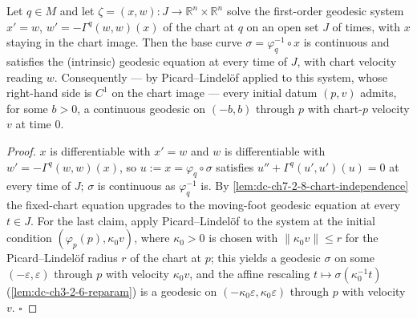\begin{lemma}
  \label{lem:dc-ch7-2-8-flow-geodesic}
  \leanok
  Let $q\in M$ and let $\zeta=(x,w):J\to\mathbb R^n\times\mathbb R^n$ solve the
  first-order geodesic system $x'=w$, $w'=-\Gamma^q(w,w)(x)$ of the chart at $q$
  on an open set $J$ of times, with $x$ staying in the chart image. Then the base
  curve $\sigma=\varphi_q^{-1}\circ x$ is continuous and satisfies the (intrinsic)
  geodesic equation at every time of $J$, with chart velocity reading $w$.
  Consequently — by Picard–Lindelöf applied to this system, whose right-hand side
  is $C^1$ on the chart image — every initial datum $(p,v)$ admits, for some
  $b>0$, a continuous geodesic on $(-b,b)$ through $p$ with chart-$p$ velocity
  $v$ at time $0$.
\end{lemma}
\begin{proof}
  \leanok
  $x$ is differentiable with $x'=w$ and $w$ is differentiable with
  $w'=-\Gamma^q(w,w)(x)$, so $u:=x=\varphi_q\circ\sigma$ satisfies
  $u''+\Gamma^q(u',u')(u)=0$ at every time of $J$; $\sigma$ is continuous as
  $\varphi_q^{-1}$ is. By \cref{lem:dc-ch7-2-8-chart-independence} the fixed-chart
  equation upgrades to the moving-foot geodesic equation at every $t\in J$.
  For the last claim, apply Picard–Lindelöf to the system at the initial condition
  $(\varphi_p(p),\kappa_0v)$, where $\kappa_0>0$ is chosen with
  $\|\kappa_0v\|\le r$ for the Picard–Lindelöf radius $r$ of the chart at $p$;
  this yields a geodesic $\sigma$ on some $(-\varepsilon,\varepsilon)$ through $p$
  with velocity $\kappa_0v$, and the affine rescaling
  $t\mapsto\sigma(\kappa_0^{-1}t)$ (\cref{lem:dc-ch3-2-6-reparam}) is a geodesic
  on $(-\kappa_0\varepsilon,\kappa_0\varepsilon)$ through $p$ with velocity $v$.
  $\square$
\end{proof}

